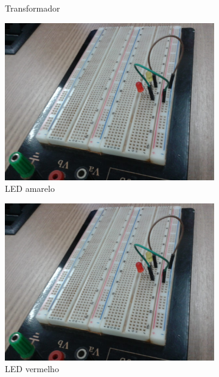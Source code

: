 \documentclass[
	12pt,				%
	openright,			%
	twoside,			%
	a4paper,			%
	article,	
	english,			%
	french,				%
	spanish,			%
	brazil				%
	]{abntex2}
\begin{document}
\begin{figure}[H]
\begin{subfigure}[H]{0.3\textwidth}
		\caption{Transformador}
	\end{subfigure}
\hfill
	\begin{subfigure}[H]{0.3\textwidth}\center
		\includegraphics[trim=30cm 20.5cm 11.5cm 10cm,clip,width=\textwidth]{led(s).jpeg}
		\caption{LED amarelo}
	\end{subfigure}
\hfill
	\begin{subfigure}[H]{0.3\textwidth}\center
		\includegraphics[trim=27cm 17.7cm 14cm 12.3cm,clip,width=\textwidth]{led(s).jpeg}
		\caption{LED vermelho}
	\end{subfigure}
\hfill
	\begin{subfigure}[H]{0.3\textwidth}\center

\end{subfigure}
\end{figure}
\end{document}
